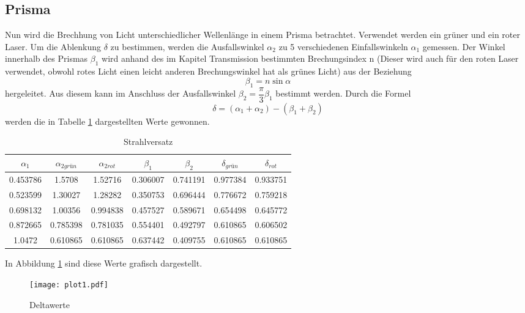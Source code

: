 \subsection{Prisma}
  Nun wird die Brechhung von Licht unterschiedlicher Wellenlänge in einem Prisma betrachtet.
  Verwendet werden ein grüner und ein roter Laser. Um die Ablenkung $\delta$ zu bestimmen,
  werden die Ausfallswinkel $\alpha_2$ zu 5 verschiedenen Einfallswinkeln $\alpha_1$ gemessen.
  Der Winkel innerhalb des Prismas $\beta_1$ wird anhand des im Kapitel Transmission bestimmten 
  Brechungsindex n (Dieser wird auch für den roten Laser verwendet, obwohl rotes Licht einen
  leicht anderen Brechungswinkel hat als grünes Licht) aus der Beziehung 
  \begin{equation*}
    \beta_1=n\sin{\alpha}
  \end{equation*}
  hergeleitet. Aus diesem kann im Anschluss der Ausfallswinkel $\beta_2=\dfrac{\pi}{3}\beta_1$
  bestimmt werden. 
  Durch die Formel
  \begin{equation*}
    \delta = (\alpha_1+\alpha_2)-(\beta_1+\beta_2)
  \end{equation*}
  werden die in Tabelle \ref{tab:strahlv} dargestellten Werte gewonnen.
  \begin{table}[H]
    \centering
    \caption{Strahlversatz}
    \begin{tabular}{c c c c c c c}
      \toprule
      $\alpha_1$ & $\alpha_{2grün} $  & $\alpha_{2rot}$ & $\beta_1$ & $\beta_2$ & $\delta_{grün}$& $\delta_{rot}$\\
      \midrule
      0.453786 & 1.5708   & 1.52716  & 0.306007 & 0.741191 & 0.977384 & 0.933751 \\
      0.523599 & 1.30027  & 1.28282  & 0.350753 & 0.696444 & 0.776672 & 0.759218 \\
      0.698132 & 1.00356  & 0.994838 & 0.457527 & 0.589671 & 0.654498 & 0.645772 \\
      0.872665 & 0.785398 & 0.781035 & 0.554401 & 0.492797 & 0.610865 & 0.606502 \\
      1.0472   & 0.610865 & 0.610865 & 0.637442 & 0.409755 & 0.610865 & 0.610865 \\
      \bottomrule
    \end{tabular}
    \label{tab:strahlv}
  \end{table}
  In Abbildung \ref{fig:plot} sind diese Werte grafisch dargestellt.
  \begin{figure}[H]
    \centering
    \texttt{[image: plot1.pdf]}
    \caption{Deltawerte}
    \label{fig:plot}
  \end{figure}

